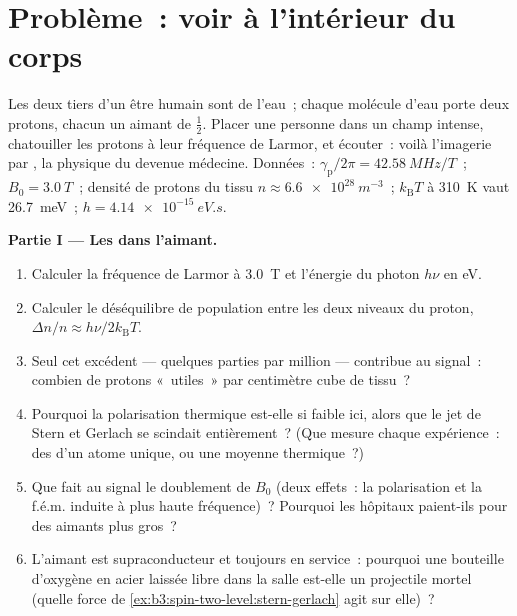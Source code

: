 \section{Problème~: voir à l'intérieur du corps}

\begin{problem}\label{pb:b3:spin-two-level:1}
Les deux tiers d'un être humain sont de l'eau~; chaque molécule d'eau
porte deux protons, chacun un aimant de  $\tfrac12$. Placer une
personne dans un champ intense, chatouiller les protons à leur
fréquence de Larmor, et écouter~: voilà l'imagerie par , la physique du  devenue médecine. Données~:
$\gamma_{\text{p}}/2\pi = \qty{42.58}{MHz/T}$~; $B_0 = \qty{3.0}{T}$~;
densité de protons du tissu $n \approx \qty{6.6e28}{m^{-3}}$~;
$k_{\text{B}}T$ à \qty{310}{K} vaut \qty{26.7}{meV}~; $h =
\qty{4.14e-15}{eV.s}$.

\medskip\noindent\textbf{Partie I --- Les  dans l'aimant.}
\begin{enumerate}
  \item Calculer la fréquence de Larmor à \qty{3.0}{T} et l'énergie
        du photon $h\nu$ en eV.
  \item Calculer le déséquilibre de population entre les deux niveaux
        du proton, $\Delta n/n \approx h\nu/2k_{\text{B}}T$.
  \item Seul cet excédent --- quelques parties par million ---
        contribue au signal~: combien de protons «~utiles~» par
        centimètre cube de tissu~?
  \item Pourquoi la polarisation thermique est-elle si faible ici,
        alors que le jet de Stern et Gerlach se scindait
        entièrement~? (Que mesure chaque expérience~: des  d'un atome unique, ou une moyenne thermique~?)
  \item Que fait au signal le doublement de $B_0$ (deux effets~: la
        polarisation et la f.é.m. induite à plus haute fréquence)~?
        Pourquoi les hôpitaux paient-ils pour des aimants plus gros~?
  \item L'aimant est supraconducteur et toujours en service~:
        pourquoi une bouteille d'oxygène en acier laissée libre dans
        la salle est-elle un projectile mortel (quelle force de
        \cref{ex:b3:spin-two-level:stern-gerlach} agit sur elle)~?
\end{enumerate}


\end{problem}
